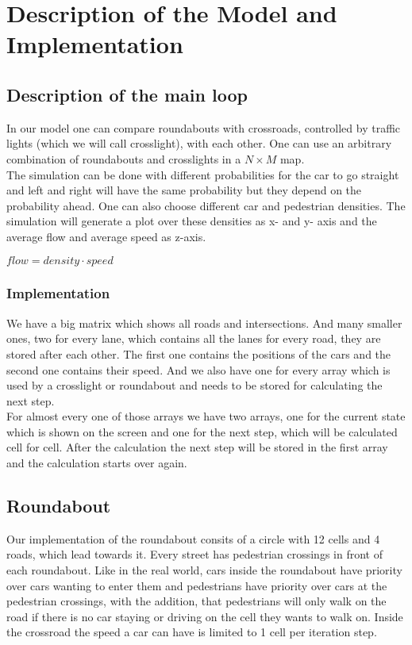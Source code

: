 \section{Description of the Model and Implementation}

\subsection{Description of the main loop}

In our model one can compare roundabouts with crossroads, controlled by traffic lights (which we will call crosslight), with each other. One can use an arbitrary combination of roundabouts and crosslights in a $N \times M$ map. \\
The simulation can be done with different probabilities for the car to go straight and left and right will have the same probability but they depend on the probability ahead. One can also choose different car and pedestrian densities. 
The simulation will generate a plot over these densities as x- and y- axis and the average flow and average speed as z-axis. 

\begin{center} 
$flow = density \cdot speed$
\end{center}

\subsubsection{Implementation}

We have a big matrix which shows all roads and intersections. And many smaller ones, two for every lane, which contains all the lanes for every road, they are stored after each other. 
The first one contains the positions of the cars and the second one contains their speed. And we also have one for every array which is used by a crosslight or roundabout and needs to be stored for calculating the next step.\\

For almost every one of those arrays we have two arrays, one for the current state which is shown on the screen and one for the next step, which will be calculated cell for cell. 
After the calculation the next step will be stored in the first array and the calculation starts over again.

\subsection{Roundabout}
Our implementation of the roundabout consits of a circle with 12 cells and 4 roads, which lead towards it. Every street has pedestrian crossings in front of each roundabout. 
Like in the real world, cars inside the roundabout have priority over cars wanting to enter them and pedestrians have priority over cars at the pedestrian crossings, 
with the addition, that pedestrians will only walk on the road if there is no car staying or driving on the cell they wants to walk on. 
Inside the crossroad the speed a car can have is limited to 1 cell per iteration step. \\


